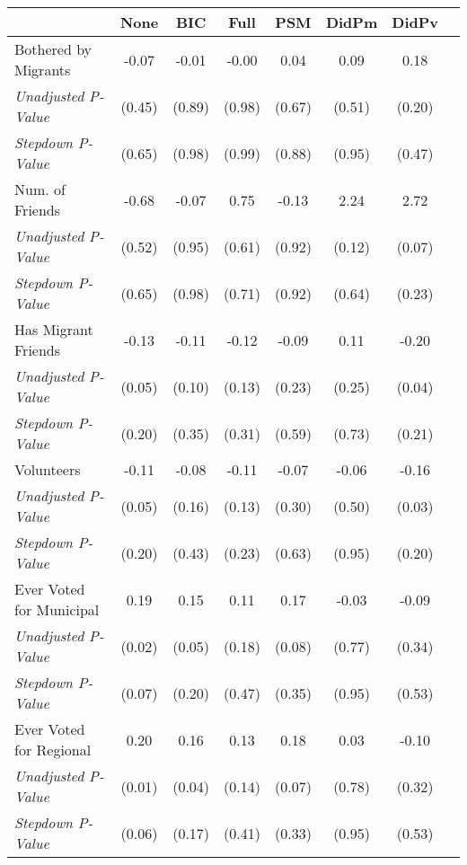 \begin{tabular}{l c c c c c c c}
\toprule
 & None & BIC & Full & PSM & DidPm & DidPv \\
\midrule
Bothered by Migrants & -0.07 & -0.01 & -0.00 & 0.04 & 0.09 & 0.18 \\
\quad \textit{Unadjusted P-Value} & (0.45) & (0.89) & (0.98) & (0.67) & (0.51) & (0.20) \\
\quad \textit{Stepdown P-Value} & (0.65) & (0.98) & (0.99) & (0.88) & (0.95) & (0.47) \\
Num. of Friends & -0.68 & -0.07 & 0.75 & -0.13 & 2.24 & 2.72 \\
\quad \textit{Unadjusted P-Value} & (0.52) & (0.95) & (0.61) & (0.92) & (0.12) & (0.07) \\
\quad \textit{Stepdown P-Value} & (0.65) & (0.98) & (0.71) & (0.92) & (0.64) & (0.23) \\
Has Migrant Friends & -0.13 & -0.11 & -0.12 & -0.09 & 0.11 & -0.20 \\
\quad \textit{Unadjusted P-Value} & (0.05) & (0.10) & (0.13) & (0.23) & (0.25) & (0.04) \\
\quad \textit{Stepdown P-Value} & (0.20) & (0.35) & (0.31) & (0.59) & (0.73) & (0.21) \\
Volunteers & -0.11 & -0.08 & -0.11 & -0.07 & -0.06 & -0.16 \\
\quad \textit{Unadjusted P-Value} & (0.05) & (0.16) & (0.13) & (0.30) & (0.50) & (0.03) \\
\quad \textit{Stepdown P-Value} & (0.20) & (0.43) & (0.23) & (0.63) & (0.95) & (0.20) \\
Ever Voted for Municipal & 0.19 & 0.15 & 0.11 & 0.17 & -0.03 & -0.09 \\
\quad \textit{Unadjusted P-Value} & (0.02) & (0.05) & (0.18) & (0.08) & (0.77) & (0.34) \\
\quad \textit{Stepdown P-Value} & (0.07) & (0.20) & (0.47) & (0.35) & (0.95) & (0.53) \\
Ever Voted for Regional & 0.20 & 0.16 & 0.13 & 0.18 & 0.03 & -0.10 \\
\quad \textit{Unadjusted P-Value} & (0.01) & (0.04) & (0.14) & (0.07) & (0.78) & (0.32) \\
\quad \textit{Stepdown P-Value} & (0.06) & (0.17) & (0.41) & (0.33) & (0.95) & (0.53) \\
\bottomrule
\end{tabular}
